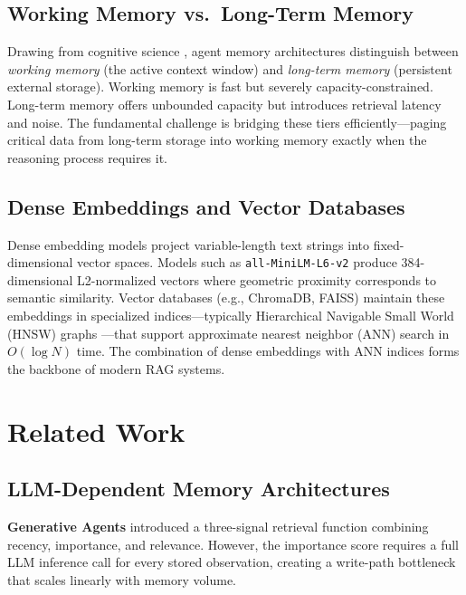 \documentclass[conference]{IEEEtran}
\begin{document}
\subsection{Working Memory vs.\ Long-Term Memory}
Drawing from cognitive science \cite{sumers2023cognitive}, agent memory architectures distinguish between \textit{working memory} (the active context window) and \textit{long-term memory} (persistent external storage). Working memory is fast but severely capacity-constrained. Long-term memory offers unbounded capacity but introduces retrieval latency and noise. The fundamental challenge is bridging these tiers efficiently---paging critical data from long-term storage into working memory exactly when the reasoning process requires it.

\subsection{Dense Embeddings and Vector Databases}
Dense embedding models project variable-length text strings into fixed-dimensional vector spaces. Models such as \texttt{all-MiniLM-L6-v2} \cite{reimers2019sbert} produce 384-dimensional L2-normalized vectors where geometric proximity corresponds to semantic similarity. Vector databases (e.g., ChromaDB, FAISS) maintain these embeddings in specialized indices---typically Hierarchical Navigable Small World (HNSW) graphs \cite{malkov2018hnsw}---that support approximate nearest neighbor (ANN) search in $O(\log N)$ time. The combination of dense embeddings with ANN indices forms the backbone of modern RAG systems.

\section{Related Work}
\label{sec:related}

\subsection{LLM-Dependent Memory Architectures}
\textbf{Generative Agents} \cite{park2023generative} introduced a three-signal retrieval function combining recency, importance, and relevance. However, the importance score requires a full LLM inference call for every stored observation, creating a write-path bottleneck that scales linearly with memory volume.
\end{document}
